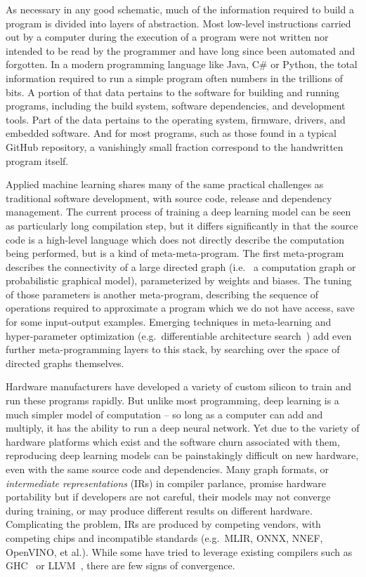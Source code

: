 \documentclass[12pt,initial,twoside,maitrise]{dms}
\numberwithin{equation}{section}
\numberwithin{table}{chapter}
\numberwithin{figure}{chapter}
\begin{document}
As necessary in any good schematic, much of the information required to build a program is divided into layers of abstraction. Most low-level instructions carried out by a computer during the execution of a program were not written nor intended to be read by the programmer and have long since been automated and forgotten. In a modern programming language like Java, C\# or Python, the total information required to run a simple program often numbers in the trillions of bits. A portion of that data pertains to the software for building and running programs, including the build system, software dependencies, and development tools. Part of the data pertains to the operating system, firmware, drivers, and embedded software. And for most programs, such as those found in a typical GitHub repository, a vanishingly small fraction correspond to the handwritten program itself.

Applied machine learning shares many of the same practical challenges as traditional software development, with source code, release and dependency management. The current process of training a deep learning model can be seen as particularly long compilation step, but it differs significantly in that the source code is a high-level language which does not directly describe the computation being performed, but is a kind of meta-meta-program. The first meta-program describes the connectivity of a large directed graph (i.e.~ a computation graph or probabilistic graphical model), parameterized by weights and biases. The tuning of those parameters is another meta-program, describing the sequence of operations required to approximate a program which we do not have access, save for some input-output examples. Emerging techniques in meta-learning and hyper-parameter optimization (e.g.~differentiable architecture search~\cite{liu2018darts}) add even further meta-programming layers to this stack, by searching over the space of directed graphs themselves.

Hardware manufacturers have developed a variety of custom silicon to train and run these programs rapidly. But unlike most programming, deep learning is a much simpler model of computation -- so long as a computer can add and multiply, it has the ability to run a deep neural network. Yet due to the variety of hardware platforms which exist and the software churn associated with them, reproducing deep learning models can be painstakingly difficult on new hardware, even with the same source code and dependencies. Many graph formats, or \textit{intermediate representations} (IRs) in compiler parlance, promise hardware portability but if developers are not careful, their models may not converge during training, or may produce different results on different hardware. Complicating the problem, IRs are produced by competing vendors, with competing chips and incompatible standards (e.g.~MLIR, ONNX, NNEF, OpenVINO, et al.). While some have tried to leverage existing compilers such as GHC~\cite{elliott2018simple} or LLVM~\cite{wei2017dlvm}, there are few signs of convergence.
\end{document}
